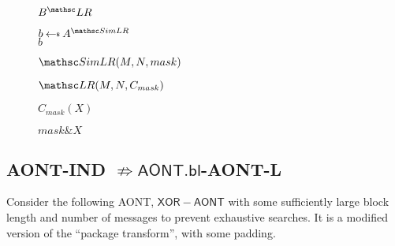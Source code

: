 \documentclass[11pt,twoside]{article}
\begin{document}
\begin{figure}[H]
{
\underline{$\advB^\LRO$}

\begin{algorithm}[H]
$b\getsr \advA^{\procfont{SimLR}}$\\
\Return $b$
\end{algorithm}

\underline{$\procfont{SimLR}(M,N,mask)$}

\begin{algorithm}[H]
\Return $\LRO(M,N,C_{mask})$
\end{algorithm}

\underline{$C_{mask}(X)$}

\begin{algorithm}[H]
\Return $mask \mathrel{\&} X$
\end{algorithm}
}
\end{figure}

\subsection{AONT-IND $\not\Rightarrow \mathsf{AONT.bl}$-AONT-L}

Consider the following AONT, $\mathsf{XOR-AONT}$ with some sufficiently large block length and number of messages to prevent exhaustive searches. It is a modified version of the ``package transform'', with some padding. 
\end{document}
